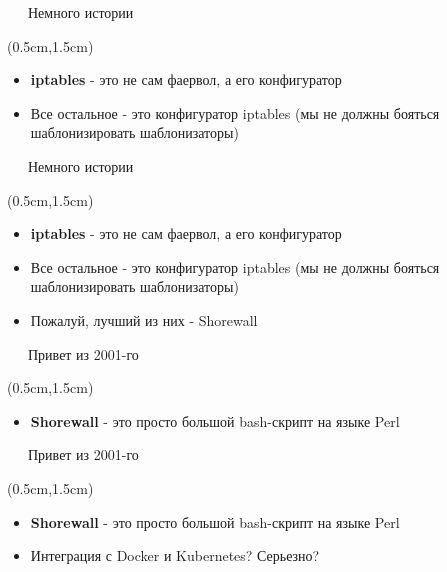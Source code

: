 \documentclass[xetex,18pt,aspectratio=43]{beamer}
\begin{document}
\begin{Large}
\begin{frame}{\ \ \ Немного истории}
\begin{textblock*}{\framewidth-0.8cm}(0.5cm,1.5cm)
\begin{itemize}
  \item {\bf iptables} - это не сам фаервол, а его конфигуратор
  \item Все остальное - это конфигуратор iptables (мы не должны бояться
    шаблонизировать шаблонизаторы)
\end{itemize}
\end{textblock*}
\end{frame}

\begin{frame}{\ \ \ Немного истории}
\begin{textblock*}{\framewidth-0.8cm}(0.5cm,1.5cm)
\begin{itemize}
  \item {\bf iptables} - это не сам фаервол, а его конфигуратор
  \item Все остальное - это конфигуратор iptables (мы не должны бояться
    шаблонизировать шаблонизаторы)
  \item Пожалуй, лучший из них - Shorewall
\end{itemize}
\end{textblock*}
\end{frame}

\begin{frame}{\ \ \ Привет из 2001-го}
\begin{textblock*}{\framewidth-0.8cm}(0.5cm,1.5cm)
\begin{itemize}
  \item {\bf Shorewall} - это просто большой bash-скрипт на языке Perl
\end{itemize}
\end{textblock*}
\end{frame}

\begin{frame}{\ \ \ Привет из 2001-го}
\begin{textblock*}{\framewidth-0.8cm}(0.5cm,1.5cm)
\begin{itemize}
  \item {\bf Shorewall} - это просто большой bash-скрипт на языке Perl
  \item Интеграция с Docker и Kubernetes? Серьезно?
\end{itemize}
\end{textblock*}
\end{frame}


\end{Large}
\end{document}
